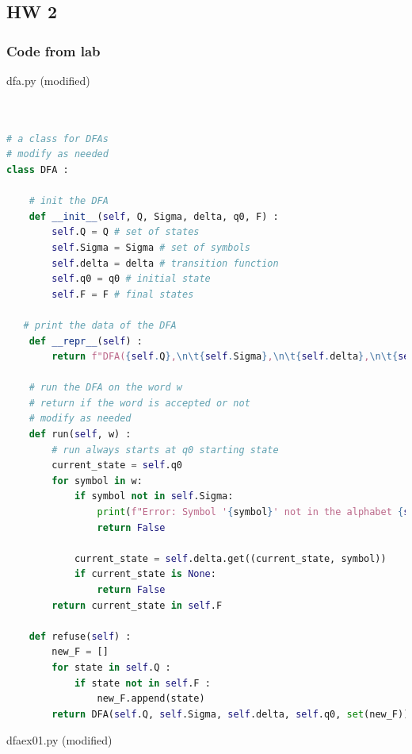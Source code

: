 \documentclass{article}
\theoremstyle{theorem}
\theoremstyle{definition}
\theoremstyle{remark}
\begin{document}
\subsection{HW 2}

\subsubsection{Code from lab}
dfa.py (modified)
\begin{lstlisting}[language=Python]


# a class for DFAs
# modify as needed
class DFA :

    # init the DFA
    def __init__(self, Q, Sigma, delta, q0, F) : 
        self.Q = Q # set of states
        self.Sigma = Sigma # set of symbols
        self.delta = delta # transition function
        self.q0 = q0 # initial state
        self.F = F # final states
   
   # print the data of the DFA
    def __repr__(self) :
        return f"DFA({self.Q},\n\t{self.Sigma},\n\t{self.delta},\n\t{self.q0},\n\t{self.F})"

    # run the DFA on the word w
    # return if the word is accepted or not
    # modify as needed
    def run(self, w) :
        # run always starts at q0 starting state
        current_state = self.q0
        for symbol in w:
            if symbol not in self.Sigma:
                print(f"Error: Symbol '{symbol}' not in the alphabet {self.Sigma}.")
                return False
    
            current_state = self.delta.get((current_state, symbol))
            if current_state is None:
                return False
        return current_state in self.F
    
    def refuse(self) :
        new_F = []
        for state in self.Q :
            if state not in self.F :
                new_F.append(state)
        return DFA(self.Q, self.Sigma, self.delta, self.q0, set(new_F))

\end{lstlisting}
dfaex01.py (modified)
\end{document}
